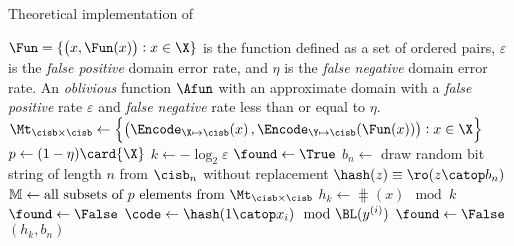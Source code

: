 \documentclass{article}
\begin{document}
\begin{algorithm}[h]
    \caption{Theoretical implementation of \protect\MakeApproxMap}
    \label{alg:shmap}
    \KwIn
    {
        $\Fun = \{\left(x,\Fun(x)\right) : x \in \X \}$ is the function defined as a set of ordered pairs, $\varepsilon$ is the \emph{false positive} domain error rate, and $\eta$ is the \emph{false negative} domain error rate.
    }
    \KwOut
    {
        An \emph{oblivious} function $\Afun$ with an approximate domain with a \emph{false positive} rate $\varepsilon$ and \emph{false negative} rate less than or equal to $\eta$.
    }
    \func{\MakeApproxMap{$\Fun$, $\varepsilon$}}
    {
        $\Mt_{\cisb \times \cisb} \gets \left\{\left(\Encode_{\X \mapsto \cisb}\!\left(x\right),\Encode_{\Y \mapsto \cisb}(\Fun(x))\right) : x \in \X\right\}$\;
        $p \gets (1 - \eta) \card{\X}$\;
        $k \gets -\log_2 \varepsilon$\;
        {
            $\found \gets \True$\;
            {
                $b_n \gets$ draw random bit string of length $n$ from $\cisb_n$ without replacement\;
                $\hash(z) \equiv \ro(z \catop b_n)$\;
                $\mathbb{M} \gets \text{all subsets of $p$ elements from $\Mt_{\cisb \times \cisb}$}$\;
                {
                    $h_k \gets \hash(x) \mod k$\;
                    {
                        {
                            $\found \gets \False$\;
                        }
                        $\code \gets \hash(1 \catop x_i) \mod \BL(y^{(i)})$\;
                        {
                            \label{line:selfterm}
                            $\found \gets \False$\;
                        }
                    }
                    \If{\found}
                    {
                        \Return $(h_k,b_n)$\;
                    }
                }
            }
        }
    }
\end{algorithm}
\end{document}
